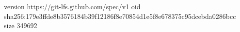 version https://git-lfs.github.com/spec/v1
oid sha256:179e3ffde8b3576184b39f12186f8e70854d1e5f8e678375c95dcebda0286bcc
size 349692
